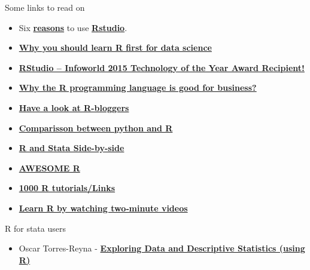 \documentclass[
  10pt,
  ignorenonframetext,
]{beamer}
\providecommand{\tightlist}{%
  \setlength{\itemsep}{0pt}\setlength{\parskip}{0pt}}
\begin{document}
\begin{frame}{Some links to read on}
\protect\hypertarget{some-links-to-read-on}{}

\begin{itemize}
\item
  Six
  \href{http://www.r-bloggers.com/top-6-reasons-you-need-to-be-using-rstudio/}{\textbf{reasons}}
  to use
  \href{https://support.rstudio.com/hc/en-us/articles/200549016-Customizing-RStudio}{\textbf{Rstudio}}.
\item
  \href{http://www.r-bloggers.com/why-you-should-learn-r-first-for-data-science/}{\textbf{Why
  you should learn R first for data science}}
\item
  \href{http://www.r-bloggers.com/rstudio-infoworld-2015-technology-of-the-year-award-recipient/}{\textbf{RStudio
  -- Infoworld 2015 Technology of the Year Award Recipient!}}
\item
  \href{http://www.fastcolabs.com/3030063/why\%20the\%20r\%20programming\%20language\%20is\%20good\%20for\%20business}{\textbf{Why
  the R programming language is good for business?}}
\item
  \href{http://www.r-bloggers.com/why-use-r/}{\textbf{Have a look at
  R-bloggers}} 
\item
  \href{http://www.dataschool.io/python-or-r-for-data-science/}{\textbf{Comparisson
  between python and R}}
\item
  \href{http://economistry.com/2013/11/r-impact-evaluation-r-stata-side-side/}{\textbf{R
  and Stata Side-by-side}}
\item
  \href{https://awesome-r.com/}{\textbf{AWESOME R}}
\item
  \href{https://support.bioconductor.org/p/33781/}{\textbf{1000 R
  tutorials/Links}}
\item
  \href{https://www.youtube.com/playlist?list=PLcgz5kNZFCkzSyBG3H-rUaPHoBXgijHfC}{\textbf{Learn
  R by watching two‐minute videos}}
\end{itemize}

\begin{block}{R for stata users}

\begin{itemize}
\tightlist
\item
  Oscar Torres-Reyna -
  \href{https://www.princeton.edu/~otorres/sessions/s2r.pdf}{\textbf{Exploring
  Data and Descriptive Statistics (using R)}}
\end{itemize}

\end{block}

\end{frame}
\end{document}
